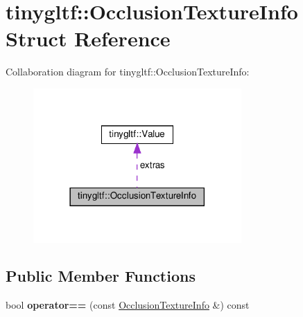 \hypertarget{structtinygltf_1_1OcclusionTextureInfo}{}\section{tinygltf\+:\+:Occlusion\+Texture\+Info Struct Reference}
\label{structtinygltf_1_1OcclusionTextureInfo}


Collaboration diagram for tinygltf\+:\+:Occlusion\+Texture\+Info\+:\nopagebreak
\begin{figure}[H]
\begin{center}
\leavevmode
\includegraphics[width=225pt]{structtinygltf_1_1OcclusionTextureInfo__coll__graph}
\end{center}
\end{figure}
\subsection*{Public Member Functions}
\begin{DoxyCompactItemize}
\item 
\mbox{\label{structtinygltf_1_1OcclusionTextureInfo_a29679a3c166327fbe12a96db67ace4f7}} 
bool {\bfseries operator==} (const \hyperlink{structtinygltf_1_1OcclusionTextureInfo}{Occlusion\+Texture\+Info} \&) const
\end{DoxyCompactItemize}
